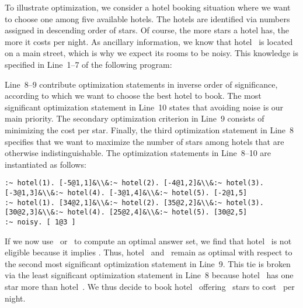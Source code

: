 \begin{example}\label{ex:opt}
To illustrate optimization, we consider a hotel booking situation
where we want to choose one among five available hotels.
The hotels are identified via numbers assigned in descending order of stars.
Of course, the more stars a hotel has, the more it costs per night.
As ancillary information, we know that hotel~ is located
on a main street, which is why we expect its rooms to be noisy.
This knowledge is specified in Line~1--7 of the following program:
%

%
Line~8--9 contribute optimization statements in inverse order of significance,
according to which we want to choose the best hotel to book.
The most significant optimization statement in Line~10 states that
avoiding noise is our main priority.
The secondary optimization criterion in Line~9 consists of minimizing the cost per star.
Finally, the third optimization statement in Line~8 specifies
that we want to maximize the number of stars among hotels that are otherwise indistinguishable.
The optimization statements in Line~8--10 are instantiated as follows:%
%
\begin{lstlisting}[firstnumber=8,breakindent=0pt,escapechar=&]
:~ hotel(1). [-5@1,1]&\\&:~ hotel(2). [-4@1,2]&\\&:~ hotel(3). [-3@1,3]&\\&:~ hotel(4). [-3@1,4]&\\&:~ hotel(5). [-2@1,5]
:~ hotel(1). [34@2,1]&\\&:~ hotel(2). [35@2,2]&\\&:~ hotel(3). [30@2,3]&\\&:~ hotel(4). [25@2,4]&\\&:~ hotel(5). [30@2,5]
:~ noisy. [ 1@3 ]
\end{lstlisting}
If we now use \clasp\ or \clingo\ to compute an optimal answer set,%
we find that hotel~ is not eligible because it implies .
Thus, hotel~ and~ remain as optimal
with respect to the second most significant optimization statement in Line~9.
This tie is broken via the least significant optimization statement in Line~8
because hotel~ has one star more than hotel~.
We thus decide to book hotel~ offering~ stars to cost~ per night.
\end{example}


